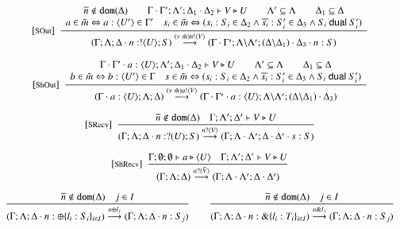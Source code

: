 \begin{figure}
	\[
	\begin{array}{c}
		{\footnotesize [\textrm{SOut}]}~~\displaystyle \frac { 
			\begin{array}{c}
				\overline{n} \notin \mathtt{dom}(\Delta)
				\qquad 
				\Gamma \cdot \Gamma'; \Lambda'; \Delta_1 \cdot \Delta_2 \vdash V \triangleright U
				\qquad
				\Lambda' \subseteq \Lambda
				\qquad
				\Delta_1 \subseteq \Delta\\
				a \in \tilde{m} \Leftrightarrow a: \langle U' \rangle \in \Gamma' \quad
				s_i \in \tilde{m} \Leftrightarrow (s_i: S_i \in \Delta_2 \wedge \overline{s_i}: S'_i \in \Delta_3 \wedge S_i \ \mathsf{dual}\  S'_i)
			\end{array}
		 }{ 
			(\Gamma; \Lambda; \Delta \cdot n: ! \langle U \rangle ; S) \stackrel{(\nu\ \tilde{m}) n ! \langle V \rangle}{\longrightarrow} (\Gamma \cdot \Gamma'; \Lambda\backslash\Lambda'; (\Delta\backslash\Delta_1) \cdot \Delta_3 \cdot n: S)			
		 } 
		\\[8mm]

		{\footnotesize [\textrm{ShOut}]}~~\displaystyle \frac { 
			\begin{array}{c}
				\Gamma \cdot \Gamma' \cdot a: \langle U \rangle; \Lambda'; \Delta_1 \cdot \Delta_2 \vdash V \triangleright U
				\qquad
				\Lambda' \subseteq \Lambda
				\qquad
				\Delta_1 \subseteq \Delta\\
				b \in \tilde{m} \Leftrightarrow b: \langle U' \rangle \in \Gamma \quad
				s \in \tilde{m} \Leftrightarrow (s_i: S_i \in \Delta_2 \wedge \overline{s_i}: S'_i \in \Delta_3 \wedge S_i \ \mathsf{dual}\  S'_i)
			\end{array}
		 }{ 
			(\Gamma\cdot a: \langle U \rangle; \Lambda; \Delta) \stackrel{(\nu\ \tilde{m}) a ! \langle V \rangle}{\longrightarrow} (\Gamma \cdot \Gamma'\cdot a: \langle U \rangle; \Lambda\backslash\Lambda'; (\Delta\backslash\Delta_1) \cdot \Delta_3)			
		 } 
		\\[8mm]


		{\footnotesize [\textrm{SRecv}]}~~\displaystyle \frac { 
			\overline{n} \notin \mathtt{dom}(\Delta) \quad \Gamma; \Lambda'; \Delta' \vdash V \triangleright U
		 }{ 
			(\Gamma; \Lambda; \Delta \cdot n: ? (U) ; S) \stackrel{n ? \langle V \rangle}{\longrightarrow} (\Gamma; \Lambda\cdot\Lambda'; \Delta\cdot\Delta' \cdot s: S)
		 } 
		\\[8mm]

		{\footnotesize [\textrm{ShRecv}]}~~\displaystyle \frac { 
			\Gamma; \emptyset; \emptyset \vdash a \triangleright \langle U \rangle
			\quad
			\Gamma; \Lambda'; \Delta' \vdash V \triangleright U
		 }{ 
			(\Gamma; \Lambda; \Delta) \stackrel{a ? \langle \tilde{V} \rangle}{\longrightarrow} (\Gamma; \Lambda\cdot\Lambda'; \Delta\cdot\Delta')
		 } 
		\\[8mm]

		\displaystyle \frac { 
			\overline{n} \notin \mathtt{dom}(\Delta) \quad j \in I
		 }{ 
			(\Gamma; \Lambda; \Delta \cdot n: \oplus \{l_i: S_i\}_{i \in I}) \stackrel{n \oplus l_j}{\longrightarrow} (\Gamma; \Lambda; \Delta \cdot n:S_j)
		 } 
		\qquad
		\displaystyle \frac { 
			\overline{n} \notin \mathtt{dom}(\Delta) \quad j \in I
		 }{ 
			(\Gamma; \Lambda; \Delta \cdot n: \& \{l_i: T_i\}_{i \in I}) \stackrel{n \& l_j}{\longrightarrow} (\Gamma; \Lambda; \Delta \cdot n:S_j)
		 } 
		\\[8mm]


\end{array}\]
\end{figure}
